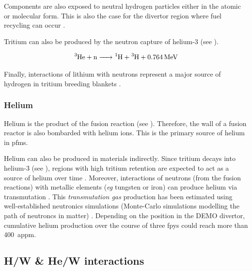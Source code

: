 Components are also exposed to neutral hydrogen particles either in the atomic or molecular form.
This is also the case for the \gls{divertor} region where \gls{fuel recycling} can occur .

Tritium can also be produced by the neutron capture of helium-3  (see ).

\begin{equation}
    \ce{^3He + n -> ^1H + ^3H + \SI{0.764}{MeV}}
    \labeq{he3 neutron capture reaction}
\end{equation}

Finally, interactions of lithium with neutrons represent a major source of hydrogen in tritium \glspl{breeding blanket} .

\subsubsection{Helium}
Helium is the product of the fusion reaction (see ).
Therefore, the wall of a fusion reactor is also bombarded with helium ions.
This is the primary source of helium in \glspl{pfm}.

Helium can also be produced in materials indirectly.
Since tritium decays into helium-3 (see ), regions with high tritium \gls{retention} are expected to act as a source of helium over time \cite{shimada_tritium_2017}.
Moreover, interactions of neutrons (from the fusion reactions) with metallic elements (\textit{eg} tungsten or iron) can produce helium via transmutation .
This \emph{\gls{transmutation gas}} production has been estimated using well-established neutronics simulations (Monte-Carlo simulations modelling the path of neutroncs in matter) .
Depending on the position in the DEMO \gls{divertor}, cumulative helium production over the course of three \glspl{fpy} could reach more than \SI{400}{appm}.


\subsection{H/W \& He/W interactions}


